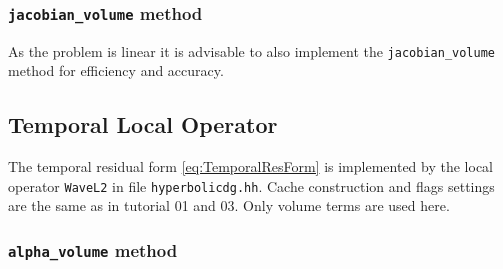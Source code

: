 \documentclass[a4paper,12pt]{article}
\theoremstyle{definition}
\theoremstyle{definition}
\begin{document}













\subsubsection*{\lstinline{jacobian_volume} method}

As the problem is linear it is advisable to also implement the
\lstinline{jacobian_volume} method for efficiency and accuracy.

%
%
%



\subsection{Temporal Local Operator}


The temporal residual form \eqref{eq:TemporalResForm} is
implemented by the local operator \lstinline{WaveL2} in
file \lstinline{hyperbolicdg.hh}. Cache construction and flags settings
are the same as in tutorial 01 and 03. Only volume terms are used here.

\subsubsection*{\lstinline{alpha_volume} method}
\end{document}
